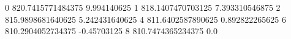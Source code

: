 0 820.7415771484375 9.994140625
1 818.1407470703125 7.393310546875
2 815.9898681640625 5.242431640625
4 811.6402587890625 0.892822265625
6 810.2904052734375 -0.45703125
8 810.7474365234375 0.0
